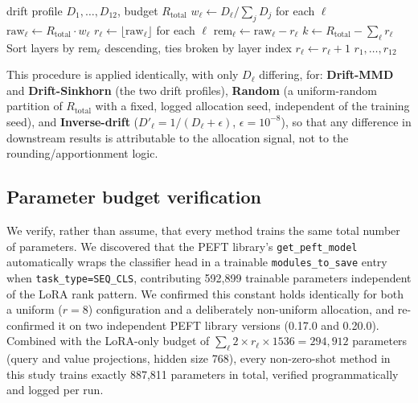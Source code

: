 \documentclass[conference]{IEEEtran}
\begin{document}
\begin{algorithm}[htbp]
\caption{Hamilton (largest-remainder) rank apportionment}
\label{alg:hamilton}
\begin{algorithmic}[1]
\REQUIRE drift profile $D_1,\ldots,D_{12}$, budget $R_{\mathrm{total}}$
\STATE $w_\ell \gets D_\ell / \sum_j D_j$ for each $\ell$
\STATE $\mathrm{raw}_\ell \gets R_{\mathrm{total}} \cdot w_\ell$
\STATE $r_\ell \gets \lfloor \mathrm{raw}_\ell \rfloor$ for each $\ell$
\STATE $\mathrm{rem}_\ell \gets \mathrm{raw}_\ell - r_\ell$ 
\STATE $k \gets R_{\mathrm{total}} - \sum_\ell r_\ell$
\STATE Sort layers by $\mathrm{rem}_\ell$ descending, ties broken by layer index
  \STATE $r_\ell \gets r_\ell + 1$
\ENDFOR
\RETURN $r_1,\ldots,r_{12}$ 
\end{algorithmic}
\end{algorithm}

This procedure is applied identically, with only $D_\ell$ differing, for: \textbf{Drift-MMD} and \textbf{Drift-Sinkhorn} (the two drift profiles), \textbf{Random} (a uniform-random partition of $R_{\mathrm{total}}$ with a fixed, logged allocation seed, independent of the training seed), and \textbf{Inverse-drift} ($D'_\ell = 1/(D_\ell+\epsilon)$, $\epsilon=10^{-8}$), so that any difference in downstream results is attributable to the allocation signal, not to the rounding/apportionment logic.

\subsection{Parameter budget verification}
\label{sec:budget-verification}
We verify, rather than assume, that every method trains the same total number of parameters. We discovered that the PEFT library's \texttt{get\_peft\_model} automatically wraps the classifier head in a trainable \texttt{modules\_to\_save} entry when \texttt{task\_type=SEQ\_CLS}, contributing 592{,}899 trainable parameters independent of the LoRA rank pattern. We confirmed this constant holds identically for both a uniform ($r{=}8$) configuration and a deliberately non-uniform allocation, and re-confirmed it on two independent PEFT library versions (0.17.0 and 0.20.0). Combined with the LoRA-only budget of $\sum_\ell 2 \times r_\ell \times 1536 = 294{,}912$ parameters (query and value projections, hidden size 768), every non-zero-shot method in this study trains exactly 887{,}811 parameters in total, verified programmatically and logged per run.
\end{document}
